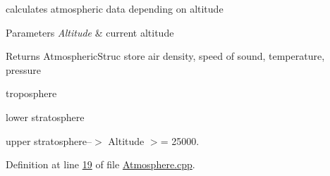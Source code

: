 calculates atmospheric data depending on altitude 


\begin{DoxyParams}{Parameters}
{\em Altitude} & current altitude \\
\hline
\end{DoxyParams}
\begin{DoxyReturn}{Returns}
Atmospheric\+Struc store air density, speed of sound, temperature, pressure 
\end{DoxyReturn}
troposphere

lower stratosphere

upper stratosphere--$>$ Altitude $>$= 25000. 

Definition at line \hyperlink{_atmosphere_8cpp_source_l00019}{19} of file \hyperlink{_atmosphere_8cpp_source}{Atmosphere.\+cpp}.

